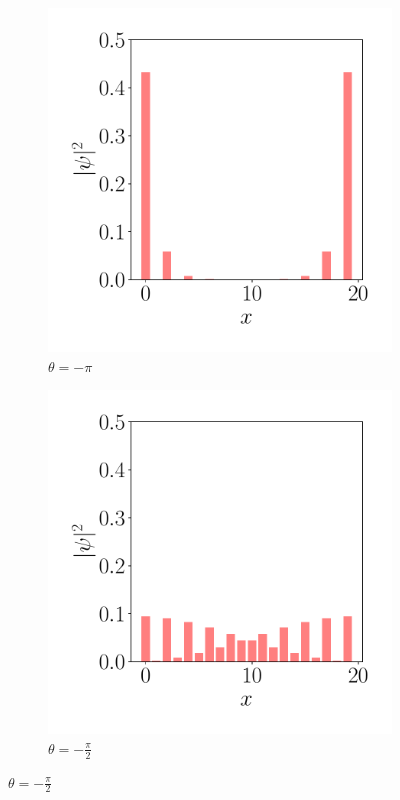 \begin{figure}[tbh!]
    \centering
   \captionsetup[sub]{font=small}

    \begin{subfigure}[b!]{0.2 \textwidth}
        \caption*{$\theta=-\pi$}
        \includegraphics[width=\textwidth]{Imagenes/Shh_images/proyection_0.pdf}
    \end{subfigure}\hspace*{-0.9em}
    \begin{subfigure}[b!]{0.2 \textwidth}
        \caption*{$\theta=-\frac{\pi}{2}$}
        \includegraphics[width=\textwidth]{Imagenes/Shh_images/proyection_1.pdf}

\end{subfigure}
\end{figure}

